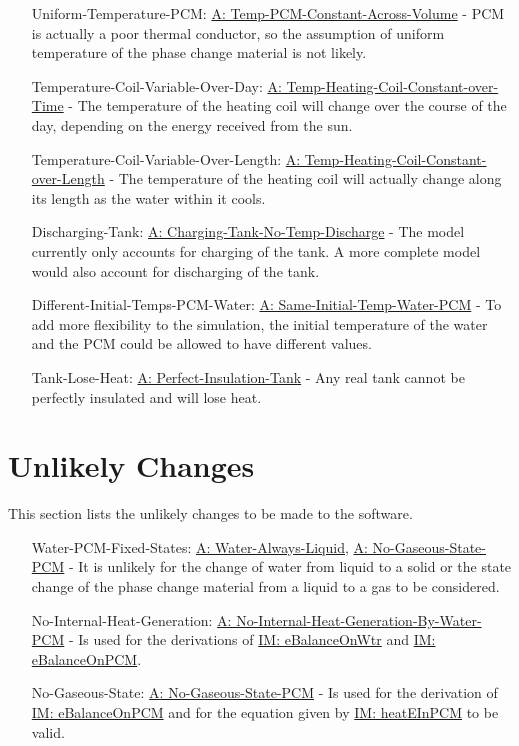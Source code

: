\documentclass[12pt]{article}
\begin{document}
\begin{itemize}
\item[Uniform-Temperature-PCM:\phantomsection\label{likeChgUTP}]{\hyperref[assumpTPCAV]{A: Temp-PCM-Constant-Across-Volume} - PCM is actually a poor thermal conductor, so the assumption of uniform temperature of the phase change material is not likely.}
\item[Temperature-Coil-Variable-Over-Day:\phantomsection\label{likeChgTCVOD}]{\hyperref[assumpTHCCoT]{A: Temp-Heating-Coil-Constant-over-Time} - The temperature of the heating coil will change over the course of the day, depending on the energy received from the sun.}
\item[Temperature-Coil-Variable-Over-Length:\phantomsection\label{likeChgTCVOL}]{\hyperref[assumpTHCCoL]{A: Temp-Heating-Coil-Constant-over-Length} - The temperature of the heating coil will actually change along its length as the water within it cools.}
\item[Discharging-Tank:\phantomsection\label{likeChgDT}]{\hyperref[assumpCTNOD]{A: Charging-Tank-No-Temp-Discharge} - The model currently only accounts for charging of the tank. A more complete model would also account for discharging of the tank.}
\item[Different-Initial-Temps-PCM-Water:\phantomsection\label{likeChgDITPW}]{\hyperref[assumpSITWP]{A: Same-Initial-Temp-Water-PCM} - To add more flexibility to the simulation, the initial temperature of the water and the PCM could be allowed to have different values.}
\item[Tank-Lose-Heat:\phantomsection\label{likeChgTLH}]{\hyperref[assumpPIT]{A: Perfect-Insulation-Tank} - Any real tank cannot be perfectly insulated and will lose heat.}
\end{itemize}
\section{Unlikely Changes}
\label{Sec:UCs}
This section lists the unlikely changes to be made to the software.

\begin{itemize}
\item[Water-PCM-Fixed-States:\phantomsection\label{unlikeChgWPFS}]{\hyperref[assumpWAL]{A: Water-Always-Liquid}, \hyperref[assumpNGSP]{A: No-Gaseous-State-PCM} - It is unlikely for the change of water from liquid to a solid or the state change of the phase change material from a liquid to a gas to be considered.}
\item[No-Internal-Heat-Generation:\phantomsection\label{unlikeChgNIHG}]{\hyperref[assumpNIHGBWP]{A: No-Internal-Heat-Generation-By-Water-PCM} - Is used for the derivations of \hyperref[IM:eBalanceOnWtr]{IM: eBalanceOnWtr} and \hyperref[IM:eBalanceOnPCM]{IM: eBalanceOnPCM}.}
\item[No-Gaseous-State:\phantomsection\label{unlikeChgNGS}]{\hyperref[assumpNGSP]{A: No-Gaseous-State-PCM} - Is used for the derivation of \hyperref[IM:eBalanceOnPCM]{IM: eBalanceOnPCM} and for the equation given by \hyperref[IM:heatEInPCM]{IM: heatEInPCM} to be valid.}
\end{itemize}
\end{document}
